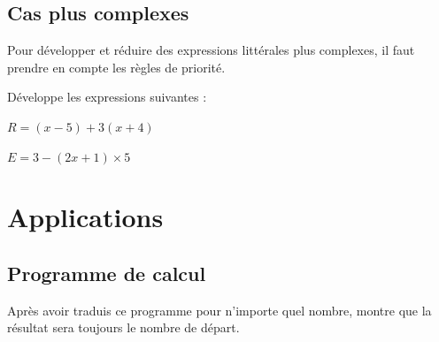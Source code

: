 \documentclass[a4paper,10pt]{report}
\begin{document}
\subsection{Cas plus complexes} 

\noindent Pour développer et réduire des expressions littérales plus complexes, il faut  prendre en compte les règles de priorité.

\begin{ex}
Développe les expressions suivantes : 

\hspace{0.5cm}\begin{minipage}{8cm}
$R = (x-5) + 3(x + 4)$
\end{minipage}
\begin{minipage}{8cm}
$E = 3 - (2x + 1) \times  5$
\end{minipage}

\noindent\grandscarreaux{\linewidth}{2.4cm}
\end{ex} 

\vspace{-2mm}
\section{Applications}

\vspace{-2mm}
\subsection{Programme de calcul}

\noindent \begin{minipage}{7.5cm}
\begin{scratch}[]
\end{scratch}
\end{minipage}
\begin{minipage}{9cm}
Après avoir traduis ce programme pour n'importe quel nombre, montre que la résultat sera toujours le nombre de départ.

\medskip
\noindent\grandscarreaux{\linewidth}{5.6cm}
\end{minipage}
\end{document}
